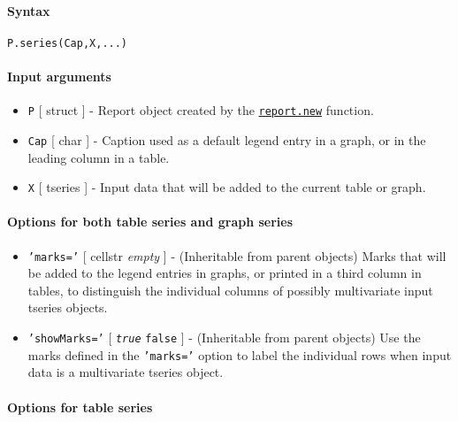 


	\paragraph{Syntax}

\begin{verbatim}
P.series(Cap,X,...)
\end{verbatim}

\paragraph{Input arguments}

\begin{itemize}
\item
  \texttt{P} {[} struct {]} - Report object created by the
  \href{report/new}{\texttt{report.new}} function.
\item
  \texttt{Cap} {[} char {]} - Caption used as a default legend entry in
  a graph, or in the leading column in a table.
\item
  \texttt{X} {[} tseries {]} - Input data that will be added to the
  current table or graph.
\end{itemize}

\paragraph{Options for both table series and graph
series}

\begin{itemize}
\item
  \texttt{'marks='} {[} cellstr \textbar{} \emph{empty} {]} -
  (Inheritable from parent objects) Marks that will be added to the
  legend entries in graphs, or printed in a third column in tables, to
  distinguish the individual columns of possibly multivariate input
  tseries objects.
\item
  \texttt{'showMarks='} {[} \emph{\texttt{true}} \textbar{}
  \texttt{false} {]} - (Inheritable from parent objects) Use the marks
  defined in the \texttt{'marks='} option to label the individual rows
  when input data is a multivariate tseries object.
\end{itemize}

\paragraph{Options for table series}

